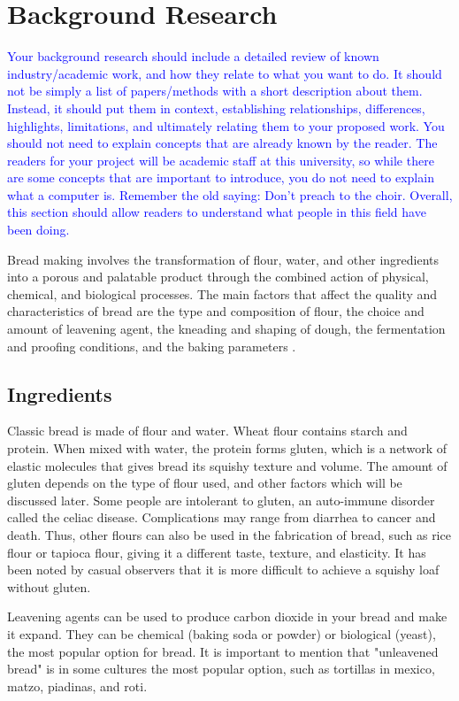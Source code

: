 \documentclass[acmtog, nonacm]{acmart}
\begin{document}
\section{Background Research}
\label{sec:background}
\textcolor{blue}{Your background research should include a detailed review of known industry/academic work, and how they relate to what you want to do.
It should not be simply a list of papers/methods with a short description about them.
Instead, it should put them in context, establishing relationships, differences, highlights, limitations, and ultimately relating them to your proposed work. 
You should not need to explain concepts that are already known by the reader. 
The readers for your project will be academic staff at this university, so while there are some concepts that are important to introduce, you do not need to explain what a computer is. 
Remember the old saying: Don't preach to the choir.
Overall, this section should allow readers to understand what people in this field have been doing.}

Bread making involves the transformation of flour, water, and other ingredients into a porous and palatable product through the combined action of physical, chemical, and biological processes.
The main factors that affect the quality and characteristics of bread are the type and composition of flour, the choice and amount of leavening agent, the kneading and shaping of dough, the fermentation and proofing conditions, and the baking parameters \cite{breadchemistry}. 

\subsection{Ingredients}

Classic bread is made of flour and water. 
Wheat flour contains starch and protein.
When mixed with water, the protein forms gluten, which is a network of elastic molecules that gives bread its squishy texture and volume. 
The amount of gluten depends on the type of flour used, and other factors which will be discussed later. 
Some people are intolerant to gluten, an auto-immune disorder called the celiac disease.
Complications may range from diarrhea to cancer and death. 
Thus, other flours can also be used in the fabrication of bread, such as rice flour or tapioca flour, giving it a different taste, texture, and elasticity.
It has been noted by casual observers that it is more difficult to achieve a squishy loaf without gluten. 

Leavening agents can be used to produce carbon dioxide in your bread and make it expand. 
They can be chemical (baking soda or powder) or biological (yeast), the most popular option for bread.
It is important to mention that "unleavened bread" is in some cultures the most popular option, such as tortillas in mexico, matzo, piadinas, and roti. 
\end{document}
